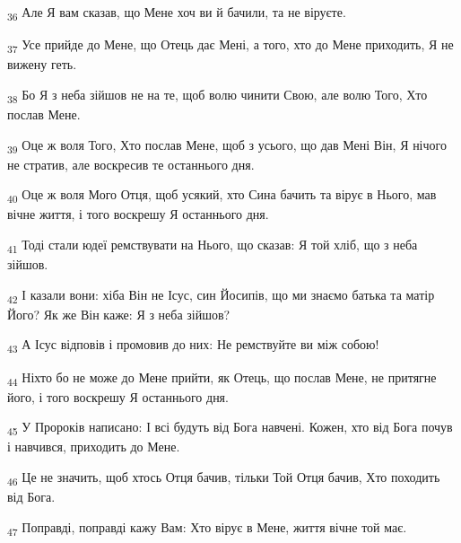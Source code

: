 \begin{tcolorbox}
\textsubscript{36} Але Я вам сказав, що Мене хоч ви й бачили, та не віруєте.
\end{tcolorbox}
\begin{tcolorbox}
\textsubscript{37} Усе прийде до Мене, що Отець дає Мені, а того, хто до Мене приходить, Я не вижену геть.
\end{tcolorbox}
\begin{tcolorbox}
\textsubscript{38} Бо Я з неба зійшов не на те, щоб волю чинити Свою, але волю Того, Хто послав Мене.
\end{tcolorbox}
\begin{tcolorbox}
\textsubscript{39} Оце ж воля Того, Хто послав Мене, щоб з усього, що дав Мені Він, Я нічого не стратив, але воскресив те останнього дня.
\end{tcolorbox}
\begin{tcolorbox}
\textsubscript{40} Оце ж воля Мого Отця, щоб усякий, хто Сина бачить та вірує в Нього, мав вічне життя, і того воскрешу Я останнього дня.
\end{tcolorbox}
\begin{tcolorbox}
\textsubscript{41} Тоді стали юдеї ремствувати на Нього, що сказав: Я той хліб, що з неба зійшов.
\end{tcolorbox}
\begin{tcolorbox}
\textsubscript{42} І казали вони: хіба Він не Ісус, син Йосипів, що ми знаємо батька та матір Його? Як же Він каже: Я з неба зійшов?
\end{tcolorbox}
\begin{tcolorbox}
\textsubscript{43} А Ісус відповів і промовив до них: Не ремствуйте ви між собою!
\end{tcolorbox}
\begin{tcolorbox}
\textsubscript{44} Ніхто бо не може до Мене прийти, як Отець, що послав Мене, не притягне його, і того воскрешу Я останнього дня.
\end{tcolorbox}
\begin{tcolorbox}
\textsubscript{45} У Пророків написано: І всі будуть від Бога навчені. Кожен, хто від Бога почув і навчився, приходить до Мене.
\end{tcolorbox}
\begin{tcolorbox}
\textsubscript{46} Це не значить, щоб хтось Отця бачив, тільки Той Отця бачив, Хто походить від Бога.
\end{tcolorbox}
\begin{tcolorbox}
\textsubscript{47} Поправді, поправді кажу Вам: Хто вірує в Мене, життя вічне той має.
\end{tcolorbox}
